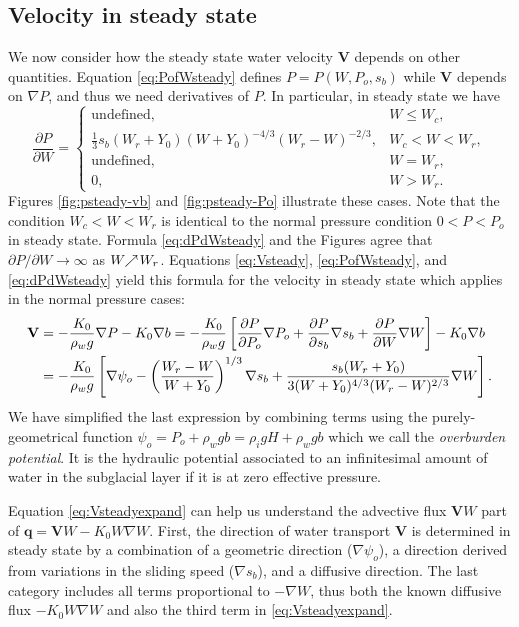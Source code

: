\documentclass[11pt,final]{amsart}%
\newcommand\bV{\mathbf{V}}
\newcommand\bq{\mathbf{q}}
\newcommand{\grad}{\nabla}
\begin{document}
\subsection*{Velocity in steady state}  We now consider how the steady state water velocity $\bV$ depends on other quantities.  Equation \eqref{eq:PofWsteady} defines $P=P(W,P_o,s_b)$ while $\bV$ depends on $\grad P$, and thus we need derivatives of $P$.  In particular, in steady state we have
\begin{equation}
\frac{\partial P}{\partial W} =
    \begin{cases}
      \text{undefined}, & W \le W_c, \\
      \frac{1}{3} s_b (W_r + Y_0) (W+Y_0)^{-4/3} (W_r - W)^{-2/3}, & W_c < W < W_r, \\
      \text{undefined}, & W = W_r, \\
      0, & W > W_r.
    \end{cases}  \label{eq:dPdWsteady}
\end{equation}
Figures \ref{fig:psteady-vb} and \ref{fig:psteady-Po} illustrate these cases.  Note that the condition $W_c < W < W_r$ is identical to the normal pressure condition $0 < P < P_o$ in steady state.  Formula \eqref{eq:dPdWsteady} and the Figures agree that $\partial P / \partial W \to \infty$ as $W \!\!\nearrow\! W_r$.  Equations \eqref{eq:Vsteady}, \eqref{eq:PofWsteady}, and \eqref{eq:dPdWsteady} yield this formula for the velocity in steady state which applies in the normal pressure cases:
\begin{align}
\bV &= - \frac{K_0}{\rho_w g} \grad P - K_0 \grad b = - \frac{K_0}{\rho_w g} \left[\frac{\partial P}{\partial P_o} \grad P_o + \frac{\partial P}{\partial s_b} \grad s_b + \frac{\partial P}{\partial W} \grad W\right] - K_0 \grad b  \notag \\
    &= - \frac{K_0}{\rho_w g} \left[\grad \psi_o - \left(\frac{W_r - W}{W+Y_0}\right)^{1/3} \grad s_b + \frac{s_b (W_r + Y_0)}{3  (W+Y_0)^{4/3} (W_r - W)^{2/3}} \grad W\right]. \label{eq:Vsteadyexpand}
\end{align}
We have simplified the last expression by combining terms using the purely-geometrical function $\psi_o = P_o + \rho_w g b = \rho_i g H + \rho_w g b$ which we call the \emph{overburden potential}.  It is the hydraulic potential associated to an infinitesimal amount of water in the subglacial layer if it is at zero effective pressure.

Equation \eqref{eq:Vsteadyexpand} can help us understand the advective flux $\bV W$ part of $\bq=\bV W - K_0 W \grad W$.  First, the direction of water transport $\bV$ is determined in steady state by a combination of a geometric direction ($\grad \psi_o$), a direction derived from variations in the sliding speed ($\grad s_b$), and a diffusive direction.  The last category includes all terms proportional to $-\grad W$, thus both the known diffusive flux $-K_0 W \grad W$ and also the third term in \eqref{eq:Vsteadyexpand}.
\end{document}
